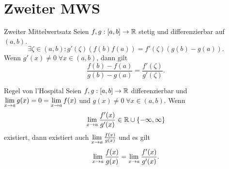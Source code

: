 \documentclass[main.tex]{subfiles}
\begin{document}
\section*{Zweiter MWS}

\begin{karte}{Zweiter Mittelwertsatz}
    Seien \( f,g : [a,b] \rightarrow \mathbb{R} \) stetig und differenzierbar 
    auf \( (a, b) \).
    \[ \exists \zeta \in (a, b):
    g'(\zeta)(f(b)  f(a)) = f'(\zeta)(g(b) - g(a)). \]
    Wenn \( g'(x) \neq 0 \; \forall x \in (a, b) \), dann gilt 
    \[ \frac{f(b) - f(a)}{g(b) - g(a)} = \frac{f'(\zeta)}{g'(\zeta)}. \]
\end{karte}
\begin{karte}{Regel von l'Hospital}
    Seien \( f,g : [a,b] \rightarrow \mathbb{R} \) differenzierbar 
    und \( \lim\limits_{x\rightarrow a} g(x) = 0 = \lim\limits_{x\rightarrow a} f(x) \)
    und \( g(x) \neq 0 \;\forall x \in (a, b) \).
    Wenn 
    \[ \lim\limits_{x\rightarrow a} \frac{f'(x)}{g'(x)} \in \mathbb{R} \cup \{-\infty, \infty\} \]
    existiert, dann existiert auch \( \lim\limits_{x\rightarrow a} \frac{f(x)}{g(x)} \)
    und es gilt 
    \[ \lim\limits_{x\rightarrow a} \frac{f(x)}{g(x)} = \lim\limits_{x\rightarrow a} \frac{f'(x)}{g'(x)}. \]
\end{karte}
\end{document}
